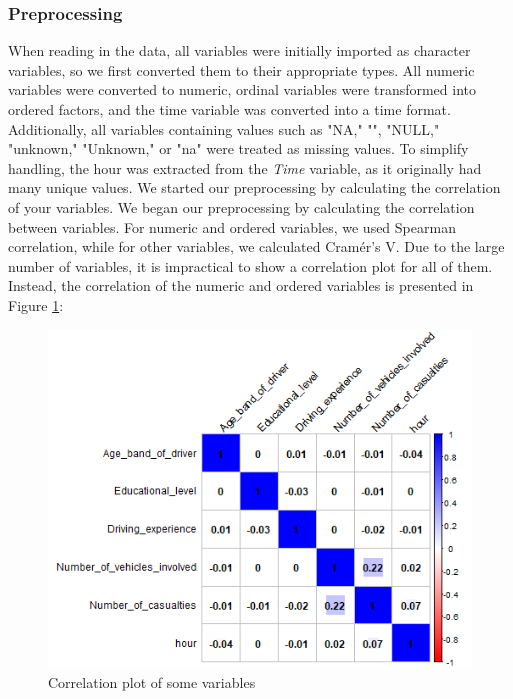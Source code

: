 \documentclass{article}
\begin{document}
\subsubsection{Preprocessing}
When reading in the data, all variables were initially imported as character variables, so we first converted them to their appropriate types. All numeric variables were converted to numeric, ordinal variables were transformed into ordered factors, and the time variable was converted into a time format. Additionally, all variables containing values such as "NA," "", "NULL," "unknown," "Unknown," or "na" were treated as missing values. To simplify handling, the hour was extracted from the \textit{Time} variable, as it originally had many unique values.
We started our preprocessing by calculating the correlation of your variables.\newline
We began our preprocessing by calculating the correlation between variables. For numeric and ordered variables, we used Spearman correlation, while for other variables, we calculated Cramér's V. Due to the large number of variables, it is impractical to show a correlation plot for all of them. Instead, the correlation of the numeric and ordered variables is presented in Figure \ref{fig:cor_RTA}:
\begin{figure}[H]
\centering
\includegraphics[width=0.8\linewidth]{plots_correlation_num_RTA.png}
\caption{\label{fig:cor_RTA} Correlation plot of some variables}
\end{figure}
\end{document}
